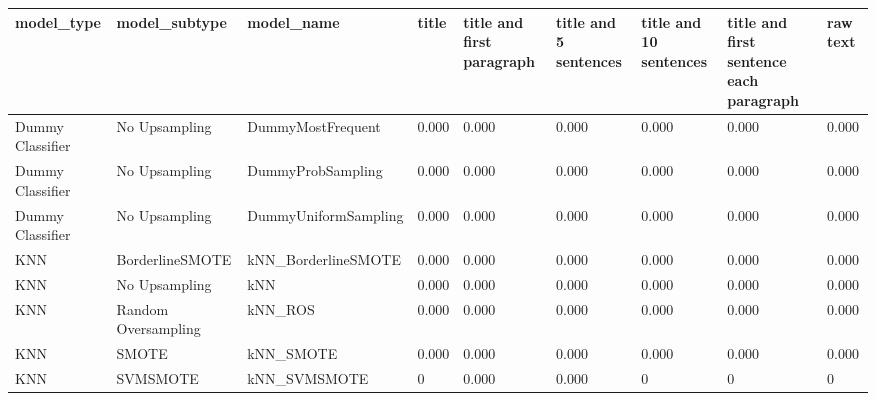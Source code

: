 \begin{tabular}{lllllllll}
\toprule
                  model\_type &       model\_subtype &                                   model\_name & title & title and first paragraph & title and 5 sentences & title and 10 sentences & title and first sentence each paragraph &  raw text \\
\midrule
            Dummy Classifier &       No Upsampling &                            DummyMostFrequent & 0.000 &                     0.000 &                 0.000 &                  0.000 &                                   0.000 &     0.000 \\
            Dummy Classifier &       No Upsampling &                            DummyProbSampling & 0.000 &                     0.000 &                 0.000 &                  0.000 &                                   0.000 &     0.000 \\
            Dummy Classifier &       No Upsampling &                         DummyUniformSampling & 0.000 &                     0.000 &                 0.000 &                  0.000 &                                   0.000 &     0.000 \\
                         KNN &     BorderlineSMOTE &                          kNN\_BorderlineSMOTE & 0.000 &                     0.000 &                 0.000 &                  0.000 &                                   0.000 &     0.000 \\
                         KNN &       No Upsampling &                                          kNN & 0.000 &                     0.000 &                 0.000 &                  0.000 &                                   0.000 &     0.000 \\
                         KNN & Random Oversampling &                                      kNN\_ROS & 0.000 &                     0.000 &                 0.000 &                  0.000 &                                   0.000 &     0.000 \\
                         KNN &               SMOTE &                                    kNN\_SMOTE & 0.000 &                     0.000 &                 0.000 &                  0.000 &                                   0.000 &     0.000 \\
                         KNN &            SVMSMOTE &                                 kNN\_SVMSMOTE &     0 &                     0.000 &                 0.000 &                      0 &                                       0 &         0 \\

\end{tabular}
